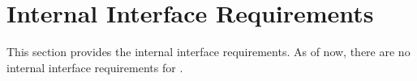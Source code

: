 \KNEADSECTIONNEWPAGE
\section{Internal Interface Requirements}
\label{lab:sec_InternalInterfaceRequirements}
% 


This section provides the internal interface requirements. As of now, there are no internal interface requirements for \ThisSys.


